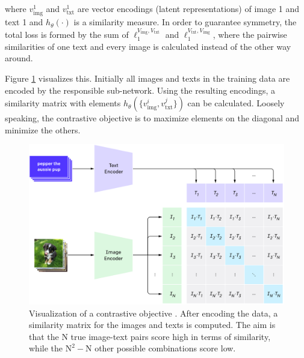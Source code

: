 \documentclass[
]{krantz}
\begin{document}
where \(v_\text{img}^1\) and \(v_\text{txt}^1\) are vector encodings (latent representations) of image 1 and text 1 and \(h_\theta(\cdot)\) is a similarity measure.
In order to guarantee symmetry, the total loss is formed by the sum of \(\ell_1^{V_\text{img}, V_\text{txt}}\) and \(\ell_1^{V_\text{txt}, V_\text{img}}\), where the pairwise similarities of one text and every image is calculated instead of the other way around.

Figure \ref{fig:contr-viz} visualizes this.
Initially all images and texts in the training data are encoded by the responsible sub-network.
Using the resulting encodings, a similarity matrix with elements \(h_\theta(\{v_\text{img}^i,v_\text{txt}^j\})\) can be calculated.
Loosely speaking, the contrastive objective is to maximize elements on the diagonal and minimize the others.

\begin{figure}

{\centering \includegraphics[width=1\linewidth]{figures/02-04-text-support-img/contrastive-pre-training} 

}

\caption{Visualization of a contrastive objective \citep{radford2021learning}. After encoding the data, a similarity matrix for the images and texts is computed. The aim is that the N true image-text pairs score high in terms of similarity, while the \(\text{N}^2 - \text{N}\) other possible combinations score low.}\label{fig:contr-viz}
\end{figure}
\end{document}

